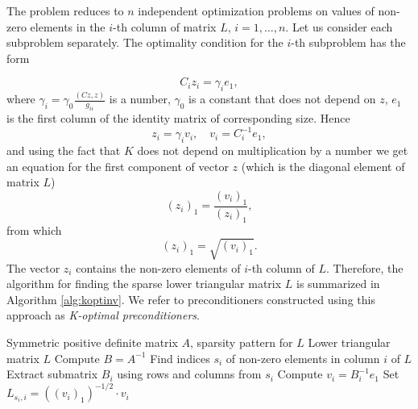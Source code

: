 \documentclass[10pt]{article} %
\theoremstyle{plain}
\theoremstyle{definition}
\theoremstyle{remark}
\begin{document}
The problem reduces to $n$ independent optimization problems on values of non-zero elements in 
the $i$-th column of matrix $L$, $i=1, \ldots, n$.
Let us consider each subproblem separately. The optimality condition for the $i$-th subproblem has the form

\begin{equation*}
	 C_i z_i = \gamma_i e_1,
\end{equation*}
where $\gamma_i = \gamma_0 \frac{(Cz, z)}{g_{ii}}$ is a number, $\gamma_0$ is a constant that does not depend on $z$, 
$e_1$ is the first column of the identity matrix of corresponding size.
Hence 
\begin{equation*}
	z_i = \gamma_i v_i, \quad v_i = C_i^{-1} e_1,
\end{equation*}
and using the fact that $K$ does not depend on multiplication by a number we get an equation 
for the first component of vector $z$ (which is
the diagonal element of matrix $L$)
\begin{equation*}
	(z_i)_1 = \frac{(v_i)_1}{(z_i)_1},
\end{equation*}
from which
\begin{equation*}
	(z_i)_1 = \sqrt{(v_i)_1}.
\end{equation*}
The vector $z_i$ contains the non-zero elements of $i$-th column of $L$.
Therefore, the algorithm for finding the sparse lower triangular matrix $L$ is summarized in Algorithm \ref{alg:koptinv}. We refer to preconditioners constructed using this approach as \emph{K-optimal preconditioners}.

\begin{algorithm}[H]
\caption{Construction of K-optimal preconditioner}
\label{alg:koptinv}
\begin{algorithmic}[1]
\Require Symmetric positive definite matrix $A$, sparsity pattern for $L$
\Ensure Lower triangular matrix $L$
\State Compute $B = A^{-1}$
    \State Find indices $s_i$ of non-zero elements in column $i$ of $L$
    \State Extract submatrix $B_i$ using rows and columns from $s_i$
    \State Compute $v_i = B_i^{-1}e_1$ 
    \State Set $L_{s_i,i} = ((v_i)_1)^{-1/2} \cdot v_i$ 
\EndFor
\end{algorithmic}
\end{algorithm}
\end{document}
